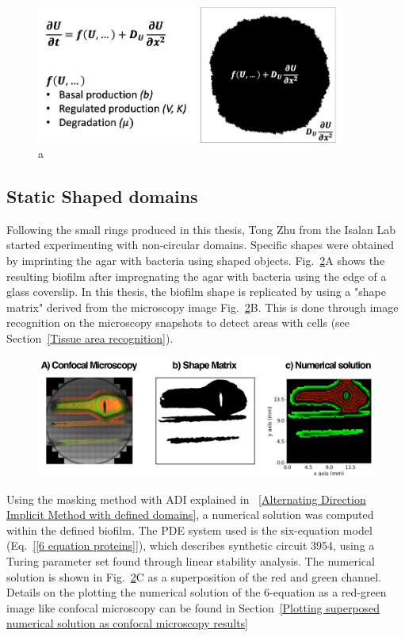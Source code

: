 \begin{figure}[H]
    \centering

    \includegraphics[width=0.9\textwidth]{chapters/Chapter 3/mask}
    \caption{a}
    \label{mask}
\end{figure}

\subsection{Static Shaped domains}
Following the small rings produced in this thesis, Tong Zhu from the Isalan Lab started experimenting with non-circular domains.
Specific shapes were obtained by imprinting the agar with bacteria using shaped objects.
Fig.~\ref{shmoo}A shows the resulting biofilm after impregnating the agar with bacteria using the edge of a glass coverslip. %
In this thesis, the biofilm shape is replicated by using a "shape matrix" derived from the microscopy image Fig.~\ref{shmoo}B.
This is done through image recognition on the microscopy snapshots to detect areas with cells (see Section~\ref{Tissue area recognition}).


\begin{figure}[H]
    \centering

    \includegraphics[width=1\textwidth]{chapters/Chapter 3/shmoo}
    \caption{}
    \label{shmoo}
\end{figure}
Using the masking method with ADI explained in ~\ref{Alternating Direction Implicit Method with defined domains}, a numerical solution was computed within the defined biofilm.
The PDE system used is the six-equation model (Eq.~\ref{[6 equation proteins]}), which describes synthetic circuit 3954, using a Turing parameter set found through linear stability analysis.
The numerical solution is shown in Fig.~\ref{shmoo}C as a superposition of the red and green channel.
Details on the plotting the numerical solution of the 6-equation as a red-green image like confocal microscopy can be found in Section~\ref{Plotting superposed numerical solution as confocal microscopy results}

